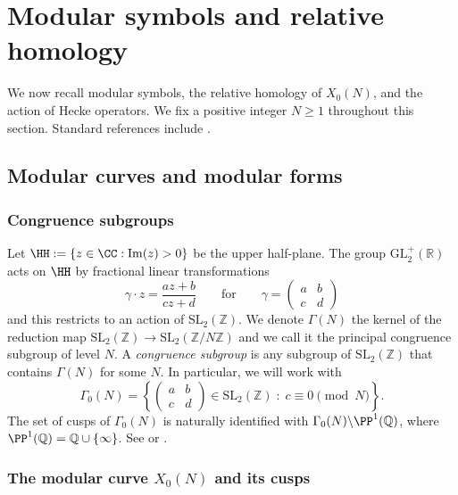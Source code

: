 \documentclass[10pt]{amsart}
\theoremstyle{theostyle}
\newcommand{\QQ}{\mathbb{Q}} \newcommand{\RR}{\mathbb{R}}
\newcommand{\ZZ}{\mathbb{Z}}
\newcommand{\im}{\mathrm{Im}}
\newcommand{\GL}{\mathrm{GL}} \newcommand{\SL}{\mathrm{SL}}
\begin{document}
\section{Modular symbols and relative homology}
\label{sec:modular-symbols}

We now recall modular symbols, the relative homology of $X_0(N)$, and the
action of Hecke operators. We fix a positive integer $N\ge 1$ throughout this
section.
Standard references include \cite{DiamonShurman:ModulaFroms,Shimura:AutoFunc,Koblitz:EllipticModular,Stein:ModularForms}.

\subsection{Modular curves and modular forms}
\subsubsection*{Congruence subgroups}

Let $\HH:=\{z\in\CC:\im(z)>0\}$
be the upper half-plane.  The group $\GL_2^+(\RR)$ acts on $\HH$ by fractional
linear transformations
\[
\gamma\cdot z = \frac{az+b}{cz+d}
\qquad\text{for}\qquad
\gamma=\begin{pmatrix}a&b\\c&d\end{pmatrix}
\]
and this restricts to an action of $\SL_2(\ZZ)$. We denote $\Gamma(N)$ the kernel of the reduction map $\SL_2(\ZZ)\to\SL_2(\ZZ/N\ZZ)$ and we call it the principal congruence subgroup of level $N$. A {\it congruence subgroup} is any subgroup of $\SL_2(\ZZ)$ that contains $\Gamma(N)$ for some $N$.
In particular, we will work with
\[
\Gamma_0(N)
=\left\{
\begin{pmatrix}a&b\\c&d\end{pmatrix}\in\SL_2(\ZZ)\;:\;c\equiv 0\pmod N
\right\}.
\]
The set of cusps of $\Gamma_0(N)$ is naturally identified with
$\Gamma_0(N)\backslash\PP^1(\QQ)$, where $\PP^1(\QQ)=\QQ\cup\{\infty\}$.
See \cite[\S1.2]{DiamonShurman:ModulaFroms} or \cite[\S1.3]{Stein:ModularForms}.


\subsubsection*{The modular curve $X_0(N)$ and its cusps}
\end{document}
